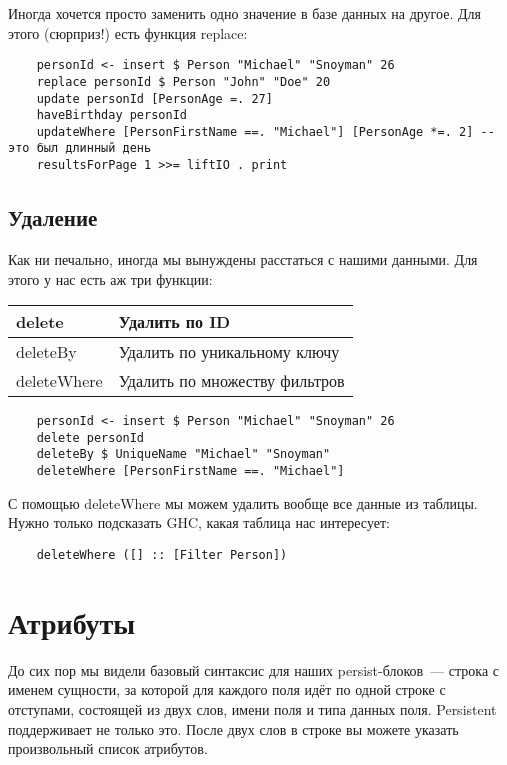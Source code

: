 Иногда хочется просто заменить одно значение в базе данных на другое. Для этого (сюрприз!) есть функция replace:

\begin{lstlisting}
    personId <- insert $ Person "Michael" "Snoyman" 26
    replace personId $ Person "John" "Doe" 20
    update personId [PersonAge =. 27]
    haveBirthday personId
    updateWhere [PersonFirstName ==. "Michael"] [PersonAge *=. 2] -- это был длинный день
    resultsForPage 1 >>= liftIO . print
\end{lstlisting}

\subsection{Удаление}

Как ни печально, иногда мы вынуждены расстаться с нашими данными. Для этого у нас есть аж три функции:

\begin{center}
\begin{tabular}{ | l | l |}
\hline
delete & Удалить по ID \\ \hline
deleteBy & Удалить по уникальному ключу \\ \hline
deleteWhere & Удалить по множеству фильтров \\ \hline
\end{tabular}
\end{center}

\begin{lstlisting}
    personId <- insert $ Person "Michael" "Snoyman" 26
    delete personId
    deleteBy $ UniqueName "Michael" "Snoyman"
    deleteWhere [PersonFirstName ==. "Michael"]
\end{lstlisting}

С помощью deleteWhere мы можем удалить вообще все данные из таблицы. Нужно только подсказать GHC, какая таблица нас интересует:

\begin{lstlisting}
    deleteWhere ([] :: [Filter Person])
\end{lstlisting}

\section{Атрибуты}

До сих пор мы видели базовый синтаксис для наших persist-блоков~--- строка с именем сущности, за которой для каждого поля идёт по одной строке с отступами, состоящей из двух слов, имени поля и типа данных поля. Persistent поддерживает не только это. После двух слов в строке вы можете указать произвольный список атрибутов.

